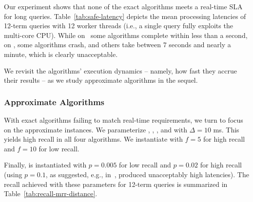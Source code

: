 { Our experiment shows that none of the exact algorithms meets a real-time SLA for  long queries. 
Table~\ref{tab:safe-latency} depicts the mean processing latencies of 12-term queries with 12 worker 
threads (i.e., a single query fully exploits the multi-core CPU). 
While on \cw\ some algorithms complete within less than a second, 
on \cwten,  some algorithms crash, and others take between 7 seconds and nearly a minute, which is clearly unacceptable.

We revisit the algorithms' execution dynamics -- namely, how fast they accrue their results -- 
as we study approximate algorithms in the sequel. 
 
\subsubsection{Approximate Algorithms}
 
With  exact  algorithms failing to match  real-time requirements, we turn to focus on the approximate instances. 
We parameterize \alg, \pRA, \pNRA, and \sNRA\/ with $\Delta=10$ ms. 
This yields high recall in all four algorithms. 
We instantiate \pBMW\/ with $f=5$ for high recall and $f=10$ for low recall.  
{Finally, \pJASS\/ is instantiated with $p=0.005$ for low recall and $p=0.02$ for high recall (using $p=0.1$, as suggested, e.g., 
in~\cite{Crane:2017}, produced unacceptably high latencies).
The recall achieved with these parameters for 12-term queries is summarized in 
Table~\ref{tab:recall-mrr-distance}. 

  
}}
